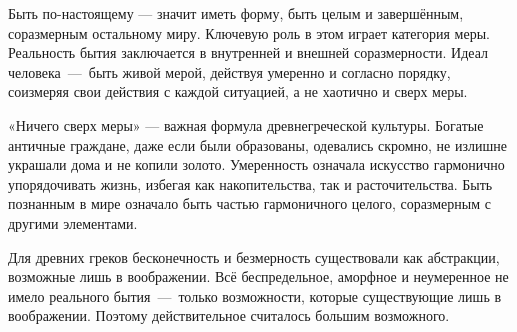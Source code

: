 \begin{enumerate}
Быть по-настоящему — значит иметь форму, быть целым и завершённым, соразмерным остальному миру. Ключевую роль в этом играет категория меры. Реальность бытия заключается в внутренней и внешней соразмерности. Идеал человека~---~быть живой мерой, действуя умеренно и согласно порядку, соизмеряя свои действия с каждой ситуацией, а не хаотично и сверх меры.


«Ничего сверх меры» — важная формула древнегреческой культуры. Богатые античные граждане, даже если были образованы, одевались скромно, не излишне украшали дома и не копили золото. Умеренность означала искусство гармонично упорядочивать жизнь, избегая как накопительства, так и расточительства. Быть познанным в мире означало быть частью гармоничного целого, соразмерным с другими элементами.


Для древних греков бесконечность и безмерность существовали как абстракции, возможные лишь в воображении. Всё беспредельное, аморфное и неумеренное не имело реального бытия~---~только возможности, которые существующие лишь в воображении. Поэтому действительное считалось большим возможного.


\end{enumerate}
